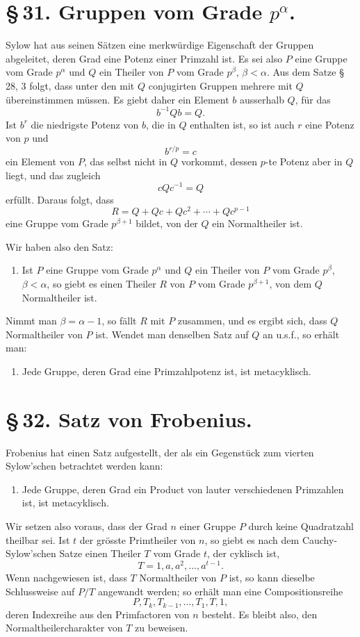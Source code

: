 \documentclass[11pt]{article}
\begin{document}
\section*{\S\,31. Gruppen vom Grade $p^\alpha$.}

Sylow hat aus seinen Sätzen eine merkwürdige Eigenschaft der Gruppen abgeleitet, deren Grad eine Potenz einer Primzahl ist. Es sei also $P$ eine Gruppe vom Grade $p^\alpha$ und $Q$ ein Theiler von $P$ vom Grade $p^\beta$, $\beta<\alpha$. Aus dem Satze \S\,28, 3 folgt, dass unter den mit $Q$ conjugirten Gruppen mehrere mit $Q$ übereinstimmen müssen. Es giebt daher ein Element $b$ ausserhalb $Q$, für das
\[
b^{-1}Qb=Q.
\]
Ist $b^r$ die niedrigste Potenz von $b$, die in $Q$ enthalten ist, so ist auch $r$ eine Potenz von $p$ und
\[
b^{r/p}=c
\]
ein Element von $P$, das selbst nicht in $Q$ vorkommt, dessen $p$-te Potenz aber in $Q$ liegt, und das zugleich
\[
cQc^{-1}=Q
\]
erfüllt. Daraus folgt, dass
\[
R=Q+Qc+Qc^2+
\cdots+Qc^{p-1}
\]
eine Gruppe vom Grade $p^{\beta+1}$ bildet, von der $Q$ ein Normaltheiler ist.

Wir haben also den Satz:
\begin{enumerate}[label=\Roman*.,leftmargin=2.4em,start=3]
\item Ist $P$ eine Gruppe vom Grade $p^\alpha$ und $Q$ ein Theiler von $P$ vom Grade $p^\beta$, $\beta<\alpha$, so giebt es einen Theiler $R$ von $P$ vom Grade $p^{\beta+1}$, von dem $Q$ Normaltheiler ist.
\end{enumerate}
Nimmt man $\beta=\alpha-1$, so fällt $R$ mit $P$ zusammen, und es ergibt sich, dass $Q$ Normaltheiler von $P$ ist. Wendet man denselben Satz auf $Q$ an u.s.f., so erhält man:
\begin{enumerate}[label=\Roman*.,leftmargin=2.4em,start=4]
\item Jede Gruppe, deren Grad eine Primzahlpotenz ist, ist metacyklisch.
\end{enumerate}

\section*{\S\,32. Satz von Frobenius.}

Frobenius hat einen Satz aufgestellt, der als ein Gegenstück zum vierten Sylow'schen betrachtet werden kann:
\begin{enumerate}[label=\Roman*.,leftmargin=2.4em,start=5]
\item Jede Gruppe, deren Grad ein Product von lauter verschiedenen Primzahlen ist, ist metacyklisch.
\end{enumerate}
Wir setzen also voraus, dass der Grad $n$ einer Gruppe $P$ durch keine Quadratzahl theilbar sei. Ist $t$ der grösste Primtheiler von $n$, so giebt es nach dem Cauchy-Sylow'schen Satze einen Theiler $T$ vom Grade $t$, der cyklisch ist,
\[
T=1,a,a^2,\ldots,a^{t-1}.
\]
Wenn nachgewiesen ist, dass $T$ Normaltheiler von $P$ ist, so kann dieselbe Schlussweise auf $P/T$ angewandt werden; so erhält man eine Compositionsreihe
\[
P,T_k,T_{k-1},\ldots,T_1,T,1,
\]
deren Indexreihe aus den Primfactoren von $n$ besteht. Es bleibt also, den Normaltheilercharakter von $T$ zu beweisen.
\end{document}
